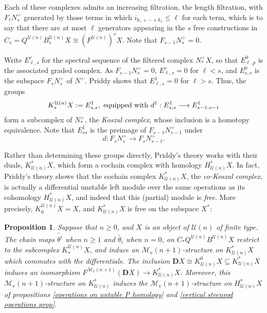 \documentclass[11pt]{amsart} \renewcommand{\baselinestretch}{1.4}
\theoremstyle{plain}
\newtheorem{prop}[thm]{Proposition}
\theoremstyle{definition}
\renewcommand{\to}{\longrightarrow}
\newcommand{\calU}{\mathcal{U}}
\newcommand{\calMv}{\mathcal{M}\dver}
\newcommand{\Nop}{N^{\smash{-}}}
\newcommand{\dver}{_\mathrm{v}}
\newcommand{\dual}{\mathbf{D}}
\begin{document}
\begin{Koszul complexes}
Each of these complexes admits an increasing filtration, the length filtration, with $F_\ell N^\div_s$ generated by those terms in which $i_{k_s+\cdots +k_1}\leq \ell$ for each term, which is to say that there are at most $\ell$ generators appearing in the $s$ free constructions in $C_s= Q^{\calU(n)}B^{\calU(n)}_sX\cong (F^{\calU(n)})^sX$. Note that $F_{s-1}N^\div_s=0$. %

Write $E^r_{\ell,s}$ for the spectral sequence of the filtered complex $N^\div_*X$, so that $E^0_{\ell,p}$ is the associated graded complex. As $F_{s-1} N^\div_s=0$, $E^r_{\ell,s}=0$ for $\ell<s$, and $E^0_{s,s}$ is the subspace $F_sN^\div_s$ of $N^\div$. %
Priddy \cite[Proof of Theorem 5.3]{PriddyKoszul.pdf} shows that $E^1_{\ell,s}=0$  for $\ell>s$. Thus, the groups
\[K_s^{\calU(n)}X:=E^1_{s,s}, \textup{ equipped with $d^1:E^1_{s,s}\to E^1_{s-1,s-1}$}\]
form a subcomplex of $N^\div_*$, the \emph{Koszul complex}, whose inclusion is a homotopy equivalence. Note that $E^1_{ss}$ is the preimage of $F_{s-1}N^\div_{s-1}$ under
\[d:F_{s}N^\div_{s}\to F_{s}N^\div_{s-1}.\]


Rather than determining these groups directly, Priddy's theory works with their duals, $K^*_{\calU(n)}X$, which form a cochain complex with homology $H^*_{\calU(n)}X$. In fact, Priddy's theory shows that the cochain complex $K^*_{\calU(n)}X$, the \emph{co-Koszul complex}, is actually a differential unstable left module over the same operations as its cohomology $H^*_{\calU(n)}X$, and indeed that this (partial) module is \emph{free}. More precisely,  $K_0^{\calU(n)}X= X$, and $K^*_{\calU(n)}X$ is free on the  subspace $X^*$:
\begin{prop}
\label{the cokoszul complex is free}
Suppose that $n\geq0$, and $X$ is an object of $\calU(n)$ of finite type. The chain maps $\widetilde{\theta^i}$ when $n\geq1$ and $\widetilde{\theta_i}$ when $n=0$, on $C_*Q^{\calU(n)}B^{\calU(n)}X$ restrict to the subcomplex $K_*^{\calU(n)}X$, and induce an $\calMv(n+1)$-structure on $K^*_{\calU(n)}X$ which commutes with the differentials. The inclusion $\dual X\cong K^0_{\calU(n)}X\subseteq K^*_{\calU(n)}X$ induces an isomorphism $F^{\calMv(n+1)}(\dual X)\to K^*_{\calU(n)}X$. Moreover, this $\calMv(n+1)$-structure on $K^*_{\calU(n)}$ induces the $\calMv(n+1)$-structure on $H^*_{\calU(n)}X$ of propositions \ref{operations on untable P homology} and \ref{vertical steenrod operations prop}.
\end{prop}



\end{Koszul complexes}
\end{document}
